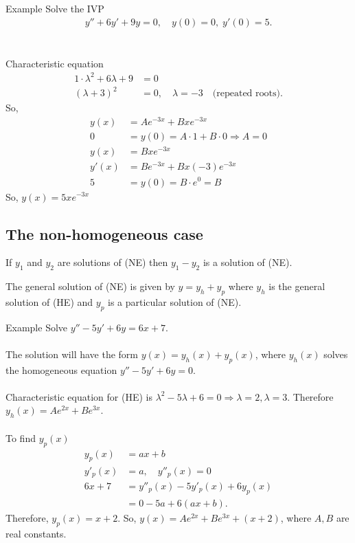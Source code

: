 \documentclass{report}
\begin{document}
			\begin{question}{Example}
				Solve the IVP
				\begin{align*}
					y'' + 6y' + 9y = 0, \quad y(0) = 0, \; y'(0) = 5.
				\end{align*}
				\\ \\
				Characteristic equation
				\begin{align*}
					1 \cdot \lambda^2 + 6 \lambda + 9 &= 0		\\
					(\lambda + 3)^2 &= 0, \quad \lambda = -3 \quad \text{(repeated roots)}.
				\end{align*}
				So, 
				\begin{align*}
					y(x) &= Ae^{-3x} + Bxe^{-3x}	\\
					0 &= y(0) = A \cdot 1 + B \cdot 0 \Rightarrow A = 0	\\
					y(x) &= Bxe^{-3x}	\\
					y'(x) &= Be^{-3x} + Bx(-3)e^{-3x}	\\
					5 &= y(0) = B \cdot e^0 = B
				\end{align*}
				So, $y(x) = 5xe^{-3x}$
			\end{question}

		\subsection{The non-homogeneous case}

			If $y_1$ and $y_2$ are solutions of (NE) then $y_1 - y_2$ is a solution of (NE).

			The general solution of (NE) is given by $y = y_h + y_p$ where $y_h$ is the general solution of (HE) and $y_p$ is a particular solution of (NE).

			\begin{question}{Example}
				Solve $y'' - 5y' + 6y = 6x + 7$.
				\\ \\
				The solution will have the form $y(x) = y_h(x) + y_p(x)$, where $y_h(x)$ solves the homogeneous equation $y'' - 5y' + 6y = 0$.
				\\ \\
				Characteristic equation for (HE) is $\lambda^2 - 5\lambda + 6 = 0 \Rightarrow \lambda = 2, \lambda = 3$. Therefore $y_h(x) = Ae^{2x} + Be^{3x}$.
				\\ \\
				To find $y_p(x)$
				\begin{align*}
					y_p(x) &= ax + b	\\
					y'_p(x) &= a, \quad y''_p(x) = 0		\\
					6x + 7 &= y''_p(x) - 5y'_p(x) + 6y_p(x)	\\
						   &= 0 - 5a + 6(ax + b).
				\end{align*}
				Therefore, $y_p(x) = x + 2$.
				So, $y(x) = Ae^{2x} +Be^{3x} + (x + 2)$, where $A,B$ are real constants.
			\end{question}
\end{document}
